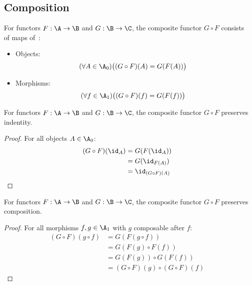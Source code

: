 \subsection{Composition}

\begin{definition}\label{def:functor_composition}

  For functors $F:\A\to \B$ and $G:\B\to \C$, the composite functor $G\circ F$
  consists of maps of~\parencite[p.~17]{leinster:basic_category_theory}:
  \begin{itemize}
    \item Objects:
      \[(\forall A \in \A_0)
        \big((G\circ F)(A) = G(F(A))\big)\]
    \item Morphisms:
      \[(\forall f\in \A_1)
        \big((G\circ F)(f) = G(F(f))\big)\]
  \end{itemize}
\end{definition}

\begin{theorem}
  For functors $F:\A\to \B$ and $G:\B\to \C$, the composite functor $G\circ F$
  preserves indentity.

  \begin{proof}
    For all objects $A\in \A_0$:
    \[
      \begin{aligned}
        (G\circ F)(\id_A)
        &= G(F(\id_A))\\
        &= G(\id_{F(A)})\\
        &= \id_{(G\circ F)(A)}
      \end{aligned}
    \]
  \end{proof}
\end{theorem}

\begin{theorem}
  For functors $F:\A\to \B$ and $G:\B\to \C$, the composite functor $G\circ F$
  preserves composition.

  \begin{proof}
    For all morphisms $f,g\in \A_1$ with $g$ composable after $f$:
    \[
      \begin{aligned}
        (G\circ F)(g\circ f)
        &= G(F(g\circ f))\\
        &= G(F(g)\circ F(f))\\
        &= G(F(g))\circ G(F(f))\\
        &= (G\circ F)(g)\circ(G\circ F)(f)
      \end{aligned}
    \]
  \end{proof}
\end{theorem}

